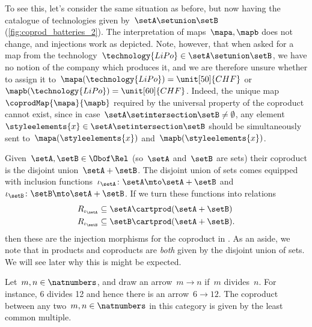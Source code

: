 \begin{example}
	To see this, let's consider the same situation as before, but now having the catalogue of technologies given by~$\setA\setunion \setB$ (\cref{fig:coprod_batteries_2}).
	The interpretation of maps~$\mapa,\mapb$ does not change, and injections work as depicted.
	Note, however, that when asked for a map from the technology~$\technology{LiPo}\in \setA\setunion \setB$, we have no notion of the company which produces it, and we are therefore unsure whether to assign it to~$\mapa(\technology{LiPo})=\unit[50]{CHF}$ or~$\mapb(\technology{LiPo})=\unit[60]{CHF}$.
	Indeed, the unique map~$\coprodMap{\mapa}{\mapb}$ required by the universal property of the coproduct cannot exist, since in case~$\setA\setintersection \setB\neq \emptyset$, any element~$\styleelements{x}\in \setA\setintersection \setB$ should be simultaneously sent to~$\mapa(\styleelements{x})$ and~$\mapb(\styleelements{x})$.

\end{example}


\begin{example}
	Given~$\setA,\setB\in \Obof\Rel$ (so~$\setA$ and~$\setB$ are sets) their coproduct is the disjoint union~$\setA+\setB$.
	The disjoint union of sets comes equipped with inclusion functions~$\iota_\setA\colon \setA\mto \setA+\setB$ and~$\iota_\setB\colon \setB\mto \setA+\setB$.
	If we turn these functions into relations
	\begin{equation*}
		\begin{aligned}
			R_{\iota_\setA} & \subseteq \setA\cartprod (\setA+\setB)  \\
			R_{\iota_\setB} & \subseteq \setB\cartprod (\setA+\setB).
		\end{aligned}
	\end{equation*}
	then these are the injection morphisms for the coproduct in \Rel.
	As an aside, we note that in \Rel products and coproducts are \emph{both} given by the disjoint union of sets.
	We will see later why this is might be expected.
\end{example}

\begin{example}
	Let~$m,n\in \natnumbers$, and draw an arrow~$m\to n$ if~$m$ divides~$n$.
	For instance, 6 divides 12 and hence there is an arrow~$6\to 12$.
	The coproduct between any two~$m,n\in \natnumbers$ in this category is given by the least common multiple.
\end{example}

